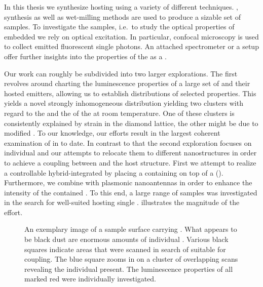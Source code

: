 	In this thesis we synthesize \nds hosting \sivs using a variety of different techniques. \Cvd, \hpht synthesis as well as wet-milling methods are used to produce a sizable set of samples. To investigate the samples, i.e.\ to study the optical properties of embedded \sivs we rely on optical excitation. In particular, confocal microscopy is used to collect emitted fluorescent single photons. An attached spectrometer or a \HBT setup offer further insights into the properties of the \siv as a \sps.

   	Our work can roughly be subdivided into two larger explorations. The first revolves around charting the luminescence properties of a large set of \nds and their hosted emitters, allowing us to establish distributions of selected \siv properties. 
   	This yields a novel strongly inhomogeneous distribution yielding two clusters with regard to the \cwls and the \lw of the \zpl at room temperature.
	One of these clusters is consistently explained by strain in the diamond lattice, the other might be due to modified \sivs.
   	To our knowledge, our efforts result in the largest coherent examination of \sivs in \nds to date. In contrast to that the second exploration focuses on individual \nds and our attempts to relocate them to different nanostructures in order to achieve a coupling between \sivs and the host structure. First we attempt to realize a controllable hybrid-integrated \sps by placing a \nd containing \sivs on top of a \vcsel (\VCSEL). Furthermore, we combine \nds with plasmonic nanoantennas in order to enhance the \pl intensity of the contained \sivs.
   	To this end, a large range of samples was investigated in the search for well-suited \nds hosting single \sivs.  illustrates the magnitude of the effort.

   	\begin{figure}[!htb]
   		\centering
   		\caption[An enormous amount of \nds visible on a sample]{An exemplary image of a sample surface carrying \nds. What appears to be black dust are enormous amounts of individual \nds. Various black squares indicate areas that were scanned in search of \nds suitable for coupling. The blue square zooms in on a cluster of overlapping scans revealing the individual \nds present. The luminescence properties of all \nds marked red were individually investigated.}
   		\label{fig::milky_way1}
   	\end{figure}

